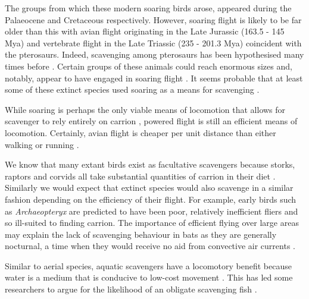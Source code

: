 \documentclass[a4paper,12pt]{article}
\begin{document}
The groups from which these modern soaring birds arose, appeared during the Palaeocene \citep[66 - 56 Million years ago (Mya); ][]{Jetz2012, Jarvis2014} and Cretaceous \citep[145.5 - 65.5 Mya; ][]{chiappe2006early} respectively. 
However, soaring flight is likely to be far older than this with avian flight originating in the Late Jurassic (163.5 - 145 Mya) and vertebrate flight in the Late Triassic (235 - 201.3 Mya) coincident with the pterosaurs. 
Indeed, scavenging among pterosaurs has been hypothesised many times before \citep{witton2008reappraisal}. 
Certain groups of these animals could reach enormous sizes \citep[e.g. Azhdarchids with wingspans of 11 metres; ][]{witton2010size} and, notably, appear to have engaged in soaring flight \citep{witton2010size}.
It seems probable that at least some of these extinct species used soaring as a means for scavenging \citep{witton2013pterosaurs}. 

While soaring is perhaps the only viable means of locomotion that allows for scavenger to rely entirely on carrion \citep{ruxton2004obligate}, powered flight is still an efficient means of locomotion. 
Certainly, avian flight is cheaper per unit distance than either walking or running \citep{tucker1975energetic}.

We know that many extant birds exist as facultative scavengers because storks, raptors and corvids all take substantial quantities of carrion in their diet \textcolor{blue}{\citep{mateo2015regional}}. 
Similarly we would expect that extinct species would also scavenge in a similar fashion depending on the efficiency of their flight. 
For example, early birds such as \textit{Archaeopteryx} are predicted to have been poor, relatively inefficient fliers \citep{nudds2010narrow} and so ill-suited to finding carrion. 
The importance of efficient flying over large areas may explain the lack of scavenging behaviour in bats as they are generally nocturnal, a time when they would receive no aid from convective air currents \citep{norberg2012vertebrate}. 

Similar to aerial species, aquatic scavengers have a locomotory benefit because water is a medium that is conducive to low-cost movement \citep{tucker1975energetic,williams1999evolution}.
This has led some researchers to argue for the likelihood of an obligate scavenging fish \citep{ruxton2004energetic,ruxton2005searching}. 
\end{document}
